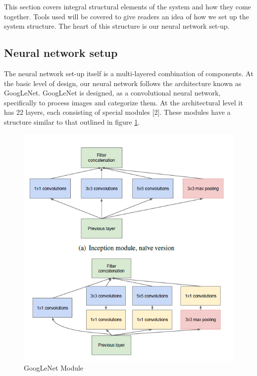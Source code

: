 \documentclass{scrreprt}
\begin{document}
This section covers integral structural elements of the system and how they come together.
Tools used will be covered to give readers an idea of how we set up the system structure.
The heart of this structure is our neural network set-up.

\subsection{Neural network setup}%

The neural network set-up itself is a multi-layered combination of components.
At the basic level of design, our neural network follows the architecture known as GoogLeNet.
GoogLeNet is designed, as a convolutional neural network, specifically to process images and categorize them.
At the architectural level it has 22 layers, each consisting of special modules [2].
These modules have a structure similar to that outlined in figure \ref{fig:4.1}.
\newline

\begin{figure}
  \includegraphics[natwidth=100,natheight=85]{GoogLeNetModule.png}
  \caption{GoogLeNet Module}
  \label{fig:4.1}
\end{figure}
\end{document}
